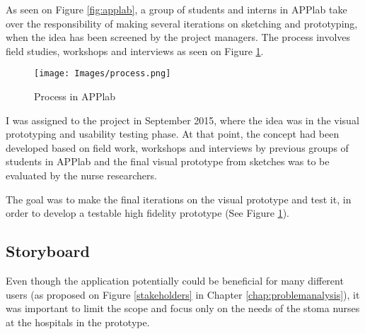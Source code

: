 As seen on Figure \ref{fig:applab}, a group of students and interns in APPlab take over the responsibility of making several iterations on sketching and prototyping, when the idea has been screened by the project managers. The process involves field studies, workshops and interviews as seen on Figure \ref{fig:process}.

\begin{figure}[!h] \centering
			\texttt{[image: Images/process.png]}
		\caption{Process in APPlab} \label{fig:process}
\end{figure}


I was assigned to the project in September 2015, where the idea was in the visual prototyping and usability testing phase. At that point, the concept had been developed based on field work, workshops and interviews by previous groups of students in APPlab and the final visual prototype from sketches was to be evaluated by the nurse researchers. 

The goal was to make the final iterations on the visual prototype and test it, in order to develop a testable high fidelity prototype (See Figure \ref{fig:process}). 


%
%
%
%


\subsection{Storyboard}
Even though the application potentially could be beneficial for many different users (as proposed on Figure \ref{stakeholders} in Chapter \ref{chap:problemanalysis}), it was important to limit the scope and focus only on the needs of the stoma nurses at the hospitals in the prototype. 

